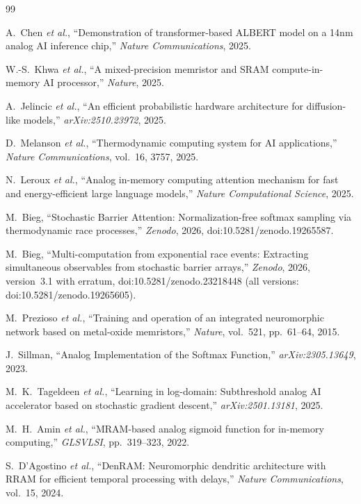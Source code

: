 \documentclass[11pt]{article}
\begin{document}
\begin{thebibliography}{99}

 A.~Chen \textit{et al.}, ``Demonstration of transformer-based ALBERT model on a 14nm analog AI inference chip,'' \textit{Nature Communications}, 2025.

 W.-S.~Khwa \textit{et al.}, ``A mixed-precision memristor and SRAM compute-in-memory AI processor,'' \textit{Nature}, 2025.

 A.~Jelincic \textit{et al.}, ``An efficient probabilistic hardware architecture for diffusion-like models,'' \textit{arXiv:2510.23972}, 2025.

 D.~Melanson \textit{et al.}, ``Thermodynamic computing system for AI applications,'' \textit{Nature Communications}, vol.~16, 3757, 2025.

 N.~Leroux \textit{et al.}, ``Analog in-memory computing attention mechanism for fast and energy-efficient large language models,'' \textit{Nature Computational Science}, 2025.

 M.~Bieg, ``Stochastic Barrier Attention: Normalization-free softmax sampling via thermodynamic race processes,'' \textit{Zenodo}, 2026, doi:10.5281/zenodo.19265587.

 M.~Bieg, ``Multi-computation from exponential race events: Extracting simultaneous observables from stochastic barrier arrays,'' \textit{Zenodo}, 2026, version~3.1 with erratum, doi:10.5281/zenodo.23218448 (all versions: doi:10.5281/zenodo.19265605).

 M.~Prezioso \textit{et al.}, ``Training and operation of an integrated neuromorphic network based on metal-oxide memristors,'' \textit{Nature}, vol.~521, pp.~61--64, 2015.

 J.~Sillman, ``Analog Implementation of the Softmax Function,'' \textit{arXiv:2305.13649}, 2023.

 M.~K.~Tageldeen \textit{et al.}, ``Learning in log-domain: Subthreshold analog AI accelerator based on stochastic gradient descent,'' \textit{arXiv:2501.13181}, 2025.

 M.~H.~Amin \textit{et al.}, ``MRAM-based analog sigmoid function for in-memory computing,'' \textit{GLSVLSI}, pp.~319--323, 2022.

 S.~D'Agostino \textit{et al.}, ``DenRAM: Neuromorphic dendritic architecture with RRAM for efficient temporal processing with delays,'' \textit{Nature Communications}, vol.~15, 2024.


\end{thebibliography}
\end{document}
